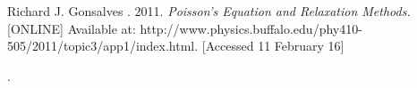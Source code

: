 \documentclass{article}
\begin{document}
\begin{thebibliography}{9}

Richard J. Gonsalves . 2011. \textit{Poisson's Equation and Relaxation Methods.} [ONLINE] Available at: http://www.physics.buffalo.edu/phy410-505/2011/topic3/app1/index.html. [Accessed 11 February 16]
	 
\end{thebibliography}
.
\end{document}
